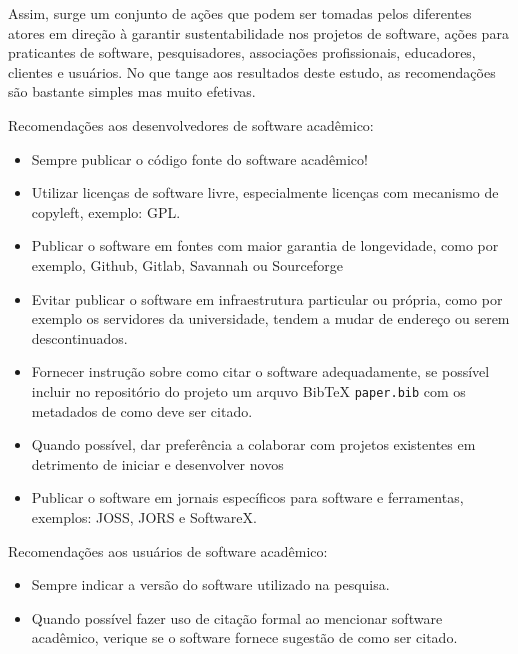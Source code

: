 Assim, surge um conjunto de ações que podem ser tomadas pelos diferentes atores
em direção à garantir sustentabilidade nos projetos de software, ações para
praticantes de software, pesquisadores, associações profissionais, educadores,
clientes e usuários. No que tange aos resultados deste estudo, as recomendações
são bastante simples mas muito efetivas.


Recomendações aos desenvolvedores de software acadêmico:

\begin{itemize}
  \item Sempre publicar o código fonte do software acadêmico!
  \item Utilizar licenças de software livre, especialmente licenças com mecanismo de copyleft, exemplo: GPL.
  \item Publicar o software em fontes com maior garantia de longevidade, como por exemplo, Github, Gitlab, Savannah ou Sourceforge
  \item Evitar publicar o software em infraestrutura particular ou própria, como por exemplo os servidores da universidade, tendem a mudar de endereço ou serem descontinuados.
  \item Fornecer instrução sobre como citar o software adequadamente, se possível incluir no repositório do projeto um arquvo BibTeX \texttt{paper.bib} com os metadados de como deve ser citado.
  \item Quando possível, dar preferência a colaborar com projetos existentes em detrimento de iniciar e desenvolver novos
  \item Publicar o software em jornais específicos para software e ferramentas, exemplos: JOSS, JORS e SoftwareX.
\end{itemize}

Recomendações aos usuários de software acadêmico:

\begin{itemize}
  \item Sempre indicar a versão do software utilizado na pesquisa.
  \item Quando possível fazer uso de citação formal ao mencionar software acadêmico, verique se o software fornece sugestão de como ser citado.
\end{itemize}


